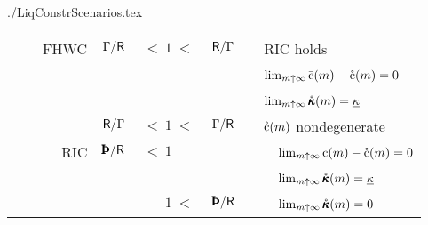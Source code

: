 \documentclass[titlepage,abstract]{bejournal}
\begin{document}
\begin{verbatimwrite}{./LiqConstrScenarios.tex}
\begin{table}[b]
\begin{center}
\begin{tabular}{|l|rcl|l|}
\\ ~~~~FHWC           & $        {\Gamma/\mathsf{R}}$ & $      {~<~}1        {~<~}$ & $        {\mathsf{R}/\Gamma}$ & ~~RIC holds %
\\ ~~~~               &                          &                             &                          & ~~$\lim_{m \uparrow \infty}\bar{\mathrm{c}}(m) - \mathring{\mathrm{c}}(m) = 0$ %
\\ ~~~~               &                          &                             &                          & ~~$\lim_{m \uparrow \infty}\mathring{\MPCFunc}(\mRat) = \MinMPC$ %
\\ ~~~~\cancel{FHWC}  & $        {\mathsf{R}/\Gamma}$ & $      {~<~}1        {~<~}$ & $        {\Gamma/\mathsf{R}}$ & ~~$\mathring{\mathrm{c}}(m)$ nondegenerate %
\\ ~~~~~~ RIC         & $        {\Pat/\Rfree} $ & $      {~<~}1\phantom{~<~}$ & $\phantom{\PGro/\Rfree}$ &~~~~$\lim_{m \uparrow \infty}\bar{\mathrm{c}}(m) - \mathring{\mathrm{c}}(m) = 0$ %
\\ ~~~~~~             &                          &                             &                          &~~~~$\lim_{\mRat \uparrow \infty} \mathring{\MPCFunc}(\mRat) =  \MinMPC$ %
\\ ~~~~~~ \cancel{RIC}& $\phantom{\Pat/\Rfree} $ & $\phantom{~<~}1      {~<~}$ & $        {\Pat/\Rfree}$  &~~~~$\lim_{m \uparrow \infty} \mathring{\pmb{\kappa}}(m) =  0$               %
\\ \hline
\end{tabular}
\end{center}
\end{table}
\end{verbatimwrite}


\end{document}

